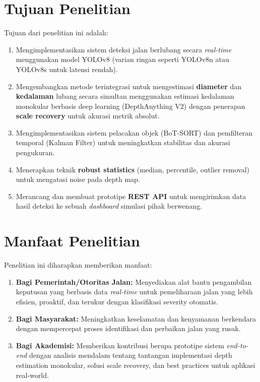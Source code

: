 \documentclass[12pt,a4paper]{report}
\begin{document}
\section{Tujuan Penelitian}

Tujuan dari penelitian ini adalah:

\begin{enumerate}
    \item Mengimplementasikan sistem deteksi jalan berlubang secara \textit{real-time} menggunakan model YOLOv8 (varian ringan seperti YOLOv8n atau YOLOv8s untuk latensi rendah).
    
    \item Mengembangkan metode terintegrasi untuk mengestimasi \textbf{diameter} dan \textbf{kedalaman} lubang secara simultan menggunakan estimasi kedalaman monokular berbasis deep learning (DepthAnything V2) dengan penerapan \textbf{scale recovery} untuk akurasi metrik absolut.
    
    \item Mengimplementasikan sistem pelacakan objek (BoT-SORT) dan pemfilteran temporal (Kalman Filter) untuk meningkatkan stabilitas dan akurasi pengukuran.
    
    \item Menerapkan teknik \textbf{robust statistics} (median, percentile, outlier removal) untuk mengatasi noise pada depth map.
    
    \item Merancang dan membuat prototipe \textbf{REST API} untuk mengirimkan data hasil deteksi ke sebuah \textit{dashboard} simulasi pihak berwenang.
\end{enumerate}

\section{Manfaat Penelitian}

Penelitian ini diharapkan memberikan manfaat:

\begin{enumerate}
    \item \textbf{Bagi Pemerintah/Otoritas Jalan:} Menyediakan alat bantu pengambilan keputusan yang berbasis data \textit{real-time} untuk pemeliharaan jalan yang lebih efisien, proaktif, dan terukur dengan klasifikasi severity otomatis.
    
    \item \textbf{Bagi Masyarakat:} Meningkatkan keselamatan dan kenyamanan berkendara dengan mempercepat proses identifikasi dan perbaikan jalan yang rusak.
    
    \item \textbf{Bagi Akademisi:} Memberikan kontribusi berupa prototipe sistem \textit{end-to-end} dengan analisis mendalam tentang tantangan implementasi depth estimation monokular, solusi scale recovery, dan best practices untuk aplikasi real-world.
\end{enumerate}
\end{document}
